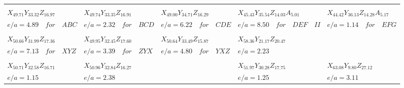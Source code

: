 \documentclass[16pt]{article}
\begin{document}
{\footnotesize
\begin{tabular}[t]{|p{4.7cm}||p{4.7cm}||p{4.7cm}||p{4.7cm}||p{4.7cm}|}
\hline
 & & & & \\
$X_{49.71} Y_{33.32} Z_{16.97}$ &
$X_{49.74} Y_{33.35} Z_{16.91}$ &
$X_{49.00} Y_{34.71} Z_{16.29}$ &
$X_{45.43} Y_{35.54} Z_{14.03} A_{5.01}$ &
$X_{44.42} Y_{36.13} Z_{14.28} A_{5.17}$ \\
$e/a = 4.89 \quad for \quad ABC$ &
$e/a = 2.32 \quad for \quad BCD $ &
$e/a = 6.22 \quad for \quad CDE $ &
$e/a = 8.50 \quad for \quad DEF \quad II $ &
$e/a = 1.14 \quad for \quad EFG$ \\
\hline
 & & & & \\
$X_{50.66} Y_{31.99} Z_{17.36}$ &
$X_{49.95} Y_{32.45} Z_{17.60}$ &
$X_{50.64} Y_{33.49} Z_{15.87}$ &
$X_{58.36} Y_{21.17} Z_{20.47}$ &
$ $ \\
$e/a = 7.13 \quad for \quad XYZ$ &
$e/a = 3.39 \quad for \quad ZYX $ &
$e/a = 4.80 \quad for \quad YXZ $ &
$e/a = 2.23 $ &
$ $ \\
\hline
 & & & & \\
$X_{50.71} Y_{32.58} Z_{16.71}$ &
$X_{50.96} Y_{32.84} Z_{16.27}$ &
$ $ &
$X_{51.97} Y_{30.28} Z_{17.75}$ &
$X_{63.08} Y_{9.80} Z_{27.12}$ \\
$e/a = 1.15 $ &
$e/a = 2.38 $ &
$ $ &
$e/a = 1.25 $ &
$e/a = 3.11 $ \\
\hline
\end{tabular} }
\end{document}
